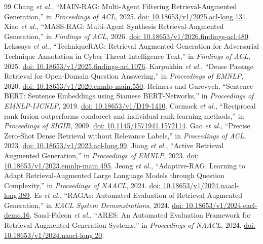 \begin{thebibliography}{99}
Chang \emph{et al.}, ``MAIN-RAG: Multi-Agent Filtering Retrieval-Augmented Generation,'' in \emph{Proceedings of ACL}, 2025. \href{https://doi.org/10.18653/v1/2025.acl-long.131}{doi: 10.18653/v1/2025.acl-long.131}.
Xiao \emph{et al.}, ``MASS-RAG: Multi-Agent Synthesis Retrieval-Augmented Generation,'' in \emph{Findings of ACL}, 2026. \href{https://doi.org/10.18653/v1/2026.findings-acl.480}{doi: 10.18653/v1/2026.findings-acl.480}.
Lekssays \emph{et al.}, ``TechniqueRAG: Retrieval Augmented Generation for Adversarial Technique Annotation in Cyber Threat Intelligence Text,'' in \emph{Findings of ACL}, 2025. \href{https://doi.org/10.18653/v1/2025.findings-acl.1076}{doi: 10.18653/v1/2025.findings-acl.1076}.
Karpukhin \emph{et al.}, ``Dense Passage Retrieval for Open-Domain Question Answering,'' in \emph{Proceedings of EMNLP}, 2020. \href{https://doi.org/10.18653/v1/2020.emnlp-main.550}{doi: 10.18653/v1/2020.emnlp-main.550}.
Reimers and Gurevych, ``Sentence-BERT: Sentence Embeddings using Siamese BERT-Networks,'' in \emph{Proceedings of EMNLP-IJCNLP}, 2019. \href{https://doi.org/10.18653/v1/D19-1410}{doi: 10.18653/v1/D19-1410}.
Cormack \emph{et al.}, ``Reciprocal rank fusion outperforms condorcet and individual rank learning methods,'' in \emph{Proceedings of SIGIR}, 2009. \href{https://doi.org/10.1145/1571941.1572114}{doi: 10.1145/1571941.1572114}.
Gao \emph{et al.}, ``Precise Zero-Shot Dense Retrieval without Relevance Labels,'' in \emph{Proceedings of ACL}, 2023. \href{https://doi.org/10.18653/v1/2023.acl-long.99}{doi: 10.18653/v1/2023.acl-long.99}.
Jiang \emph{et al.}, ``Active Retrieval Augmented Generation,'' in \emph{Proceedings of EMNLP}, 2023. \href{https://doi.org/10.18653/v1/2023.emnlp-main.495}{doi: 10.18653/v1/2023.emnlp-main.495}.
Jeong \emph{et al.}, ``Adaptive-RAG: Learning to Adapt Retrieval-Augmented Large Language Models through Question Complexity,'' in \emph{Proceedings of NAACL}, 2024. \href{https://doi.org/10.18653/v1/2024.naacl-long.389}{doi: 10.18653/v1/2024.naacl-long.389}.
Es \emph{et al.}, ``RAGAs: Automated Evaluation of Retrieval Augmented Generation,'' in \emph{EACL System Demonstrations}, 2024. \href{https://doi.org/10.18653/v1/2024.eacl-demo.16}{doi: 10.18653/v1/2024.eacl-demo.16}.
Saad-Falcon \emph{et al.}, ``ARES: An Automated Evaluation Framework for Retrieval-Augmented Generation Systems,'' in \emph{Proceedings of NAACL}, 2024. \href{https://doi.org/10.18653/v1/2024.naacl-long.20}{doi: 10.18653/v1/2024.naacl-long.20}.

\end{thebibliography}

